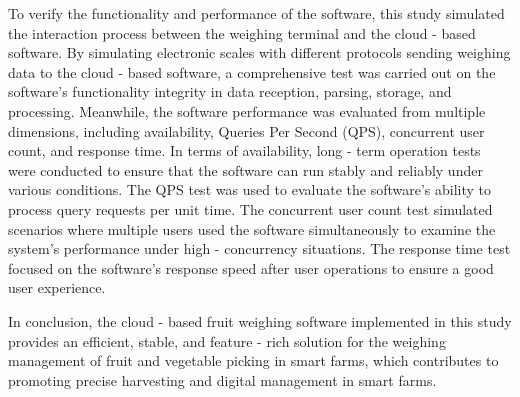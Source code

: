 To verify the functionality and performance of the software, this study simulated the interaction process between the weighing terminal and the cloud - based software. By simulating electronic scales with different protocols sending weighing data to the cloud - based software, a comprehensive test was carried out on the software's functionality integrity in data reception, parsing, storage, and processing. Meanwhile, the software performance was evaluated from multiple dimensions, including availability, Queries Per Second (QPS), concurrent user count, and response time. In terms of availability, long - term operation tests were conducted to ensure that the software can run stably and reliably under various conditions. The QPS test was used to evaluate the software's ability to process query requests per unit time. The concurrent user count test simulated scenarios where multiple users used the software simultaneously to examine the system's performance under high - concurrency situations. The response time test focused on the software's response speed after user operations to ensure a good user experience.

In conclusion, the cloud - based fruit weighing software implemented in this study provides an efficient, stable, and feature - rich solution for the weighing management of fruit and vegetable picking in smart farms, which contributes to promoting precise harvesting and digital management in smart farms. 